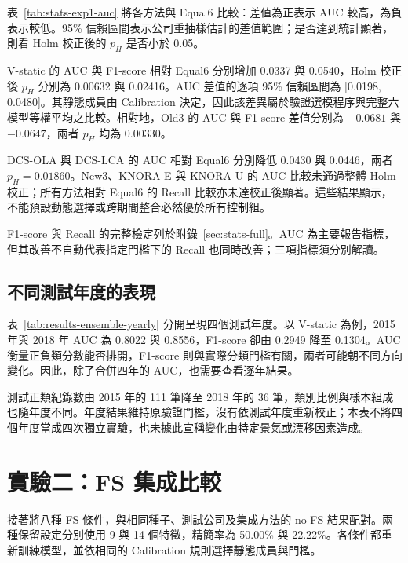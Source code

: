 

表~\ref{tab:stats-exp1-auc} 將各方法與 Equal6 比較：差值為正表示 AUC 較高，為負表示較低。95\% 信賴區間表示公司重抽樣估計的差值範圍；是否達到統計顯著，則看 Holm 校正後的 \(p_H\) 是否小於 0.05。



V-static 的 AUC 與 F1-score 相對 Equal6 分別增加 0.0337 與 0.0540，Holm 校正後 \(p_H\) 分別為 0.00632 與 0.02416。AUC 差值的逐項 95\% 信賴區間為 [0.0198, 0.0480]。其靜態成員由 Calibration 決定，因此該差異屬於驗證選模程序與完整六模型等權平均之比較。相對地，Old3 的 AUC 與 F1-score 差值分別為 \(-0.0681\) 與 \(-0.0647\)，兩者 \(p_H\) 均為 0.00330。

DCS-OLA 與 DCS-LCA 的 AUC 相對 Equal6 分別降低 0.0430 與 0.0446，兩者 \(p_H=0.01860\)。New3、KNORA-E 與 KNORA-U 的 AUC 比較未通過整體 Holm 校正；所有方法相對 Equal6 的 Recall 比較亦未達校正後顯著。這些結果顯示，不能預設動態選擇或跨期間整合必然優於所有控制組。

F1-score 與 Recall 的完整檢定列於附錄~\ref{sec:stats-full}。AUC 為主要報告指標，但其改善不自動代表指定門檻下的 Recall 也同時改善；三項指標須分別解讀。

\subsection{不同測試年度的表現}



表~\ref{tab:results-ensemble-yearly} 分開呈現四個測試年度。以 V-static 為例，2015 年與 2018 年 AUC 為 0.8022 與 0.8556，F1-score 卻由 0.2949 降至 0.1304。AUC 衡量正負類分數能否排開，F1-score 則與實際分類門檻有關，兩者可能朝不同方向變化。因此，除了合併四年的 AUC，也需要查看逐年結果。

測試正類紀錄數由 2015 年的 111 筆降至 2018 年的 36 筆，類別比例與樣本組成也隨年度不同。年度結果維持原驗證門檻，沒有依測試年度重新校正；本表不將四個年度當成四次獨立實驗，也未據此宣稱變化由特定景氣或漂移因素造成。

\section{實驗二：FS 集成比較}\label{sec:results-experiment2}

接著將八種 FS 條件，與相同種子、測試公司及集成方法的 no-FS 結果配對。兩種保留設定分別使用 9 與 14 個特徵，精簡率為 50.00\% 與 22.22\%。各條件都重新訓練模型，並依相同的 Calibration 規則選擇靜態成員與門檻。

